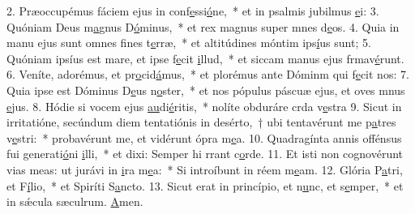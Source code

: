 2. Præoccupémus fáciem ejus in conf\uline{e}ssi\uline{ó}ne,~* et in psalmis jubilmus \uline{e}i:
3. Quóniam Deus m\uline{a}gnus D\uline{ó}minus,~* et rex magnus super mnes d\uline{e}os.
4. Quia in manu ejus sunt omnes f\uline{i}nes t\uline{e}rræ,~* et altitúdines móntim ips\uline{í}us sunt;
5. Quóniam ipsíus est mare, et ipse f\uline{e}cit \uline{i}llud,~* et siccam manus ejus frmav\uline{é}runt.
6. Veníte, adorémus, et pr\uline{o}cid\uline{á}mus,~* et plorémus ante Dóminm qui f\uline{e}cit nos:
7. Quia ipse est Dóminus D\uline{e}us n\uline{o}ster,~* et nos pópulus páscuæ ejus, et oves mnus \uline{e}jus.
8. Hódie si vocem ejus \uline{au}di\uline{é}ritis,~* nolíte obduráre crda v\uline{e}stra
9. Sicut in irritatióne, secúndum diem tentatiónis in desérto,~† ubi tentavérunt me p\uline{a}tres v\uline{e}stri:~* probavérunt me, et vidérunt ópra m\uline{e}a.
10. Quadragínta annis offénsus fui generati\uline{ó}ni \uline{i}lli,~* et dixi: Semper hi rrant c\uline{o}rde.
11. Et isti non cognovérunt vias meas: ut jurávi in \uline{i}ra m\uline{e}a:~* Si introíbunt in réem m\uline{e}am.
12. Glória P\uline{a}tri, et F\uline{í}lio,~* et Spiríti S\uline{a}ncto.
13. Sicut erat in princípio, et n\uline{u}nc, et s\uline{e}mper,~* et in sǽcula sæculrum. \uline{A}men.
